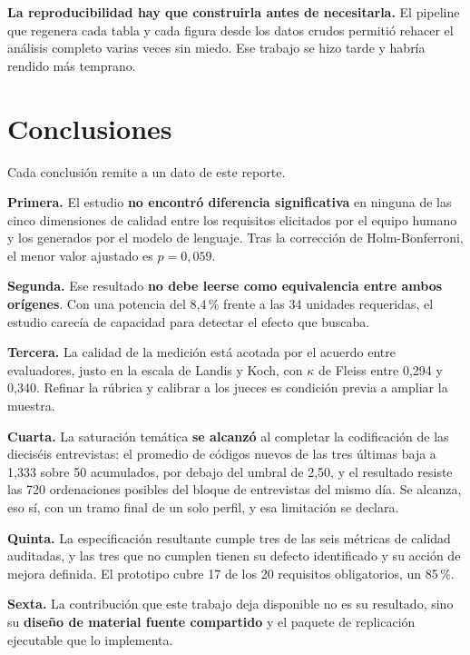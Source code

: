 \documentclass[11pt,a4paper]{article}
\begin{document}
\textbf{La reproducibilidad hay que construirla antes de necesitarla.} El pipeline que
regenera cada tabla y cada figura desde los datos crudos permiti\'o rehacer el an\'alisis
completo varias veces sin miedo. Ese trabajo se hizo tarde y habr\'ia rendido m\'as
temprano.

\section{Conclusiones}

Cada conclusi\'on remite a un dato de este reporte.

\textbf{Primera.} El estudio \textbf{no encontr\'o diferencia significativa} en ninguna
de las cinco dimensiones de calidad entre los requisitos elicitados por el equipo humano
y los generados por el modelo de lenguaje. Tras la correcci\'on de Holm-Bonferroni, el
menor valor ajustado es $p = 0{,}059$.

\textbf{Segunda.} Ese resultado \textbf{no debe leerse como equivalencia entre ambos
or\'igenes}. Con una potencia del 8,4\,\% frente a las 34 unidades requeridas, el
estudio carec\'ia de capacidad para detectar el efecto que buscaba.

\textbf{Tercera.} La calidad de la medici\'on est\'a acotada por el acuerdo entre
evaluadores, justo en la escala de Landis y Koch, con $\kappa$ de Fleiss entre 0,294 y
0,340. Refinar la r\'ubrica y calibrar a los jueces es condici\'on previa a ampliar la
muestra.

\textbf{Cuarta.} La saturaci\'on tem\'atica \textbf{se alcanz\'o} al completar la
codificaci\'on de las diecis\'eis entrevistas: el promedio de c\'odigos nuevos de las tres
\'ultimas baja a 1,333 sobre 50 acumulados, por debajo del umbral de 2,50, y el resultado
resiste las 720 ordenaciones posibles del bloque de entrevistas del mismo d\'ia. Se
alcanza, eso s\'i, con un tramo final de un solo perfil, y esa limitaci\'on se declara.

\textbf{Quinta.} La especificaci\'on resultante cumple tres de las seis m\'etricas de
calidad auditadas, y las tres que no cumplen tienen su defecto identificado y su
acci\'on de mejora definida. El prototipo cubre 17 de los 20 requisitos obligatorios, un
85\,\%.

\textbf{Sexta.} La contribuci\'on que este trabajo deja disponible no es su resultado,
sino su \textbf{dise\~no de material fuente compartido} y el paquete de replicaci\'on
ejecutable que lo implementa.
\end{document}
